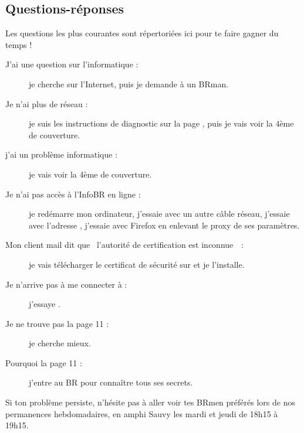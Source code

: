 \subsection{Questions-réponses}

Les questions les plus courantes sont répertoriées ici pour te faire gagner du temps !

\begin{description}

\item[J'ai une question sur l'informatique : ] je cherche sur l'Internet, puis je demande à un BRman.

\item[Je n'ai plus de réseau : ] je suis les instructions de diagnostic sur la page \pageref{diagnostic}, puis je vais voir la 4ème de couverture.

\item[j'ai un problème informatique : ] je vais voir la 4ème de couverture.

\item[Je n'ai pas accès à l'InfoBR en ligne : ] je redémarre mon ordinateur, j'essaie avec un autre câble réseau, j'essaie avec l'adresse , j'essaie avec Firefox en enlevant le proxy de ses paramètres.

\item[Mon client mail dit que \og~l'autorité de certification est inconnue~\fg\ : ] je vais télécharger le certificat de sécurité
sur  et je l'installe.

\item[Je n'arrive pas à me connecter à  : ] j'essaye .

\item[Je ne trouve pas la page 11 : ] je cherche mieux.

\item[Pourquoi la page 11 : ] j'entre au BR pour connaître tous ses secrets.

\end{description}

Si ton problème persiste, n'hésite pas à aller voir tes BRmen préférés lors de nos permanences hebdomadaires, en amphi Sauvy les mardi et jeudi de 18h15 à 19h15.
